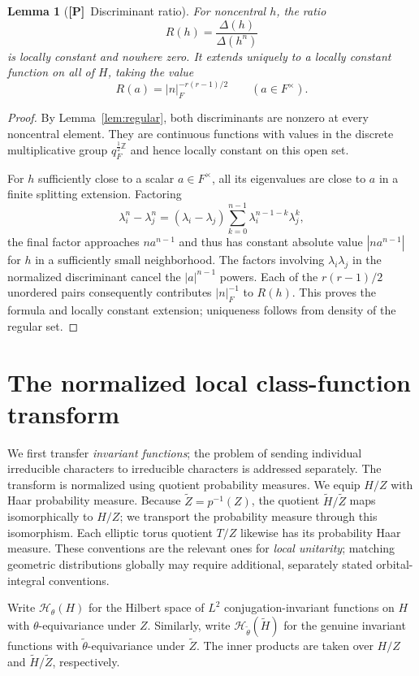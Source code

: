 \documentclass[11pt]{article}
\newcommand{\tH}{\widetilde H}
\newcommand{\tZ}{\widetilde Z}
\newcommand{\Ptag}{\textnormal{\textbf{[P]}}}
\theoremstyle{plain}
\newtheorem{lemma}[theorem]{Lemma}
\theoremstyle{definition}
\begin{document}
\begin{lemma}[\Ptag\ Discriminant ratio]\label{lem:ratio}
For noncentral $h$, the ratio
\[
R(h)=\frac{\Delta(h)}{\Delta(h^n)}
\]
is locally constant and nowhere zero. It extends uniquely to a locally constant function on all of $H$, taking the value
\begin{equation}\label{eq:ratio-at-center}
R(a)=|n|_F^{-r(r-1)/2}\qquad(a\in F^\times).
\end{equation}
\end{lemma}
\begin{proof}
By Lemma~\ref{lem:regular}, both discriminants are nonzero at every noncentral element. They are continuous functions with values in the discrete multiplicative group $q_F^{\frac12\mathbb Z}$ and hence locally constant on this open set.

For $h$ sufficiently close to a scalar $a\in F^\times$, all its eigenvalues are close to $a$ in a finite splitting extension. Factoring
\[
\lambda_i^n-\lambda_j^n=(\lambda_i-\lambda_j)
\sum_{k=0}^{n-1}\lambda_i^{n-1-k}\lambda_j^k,
\]
the final factor approaches $na^{n-1}$ and thus has constant absolute value $|na^{n-1}|$ for $h$ in a sufficiently small neighborhood. The factors involving $\lambda_i\lambda_j$ in the normalized discriminant cancel the $|a|^{n-1}$ powers. Each of the $r(r-1)/2$ unordered pairs consequently contributes $|n|_F^{-1}$ to $R(h)$. This proves the formula and locally constant extension; uniqueness follows from density of the regular set.
\end{proof}

\section{The normalized local class-function transform}\label{sec:local}
We first transfer \emph{invariant functions}; the problem of sending
individual irreducible characters to irreducible characters is
addressed separately. The transform is normalized using quotient
probability measures.
We equip $H/Z$ with Haar probability measure. Because $\tZ=p^{-1}(Z)$, the quotient $\tH/\tZ$ maps isomorphically to $H/Z$; we transport the probability measure through this isomorphism. Each elliptic torus quotient $T/Z$ likewise has its probability Haar measure. These conventions are the relevant ones for \emph{local unitarity}; matching geometric distributions globally may require additional, separately stated orbital-integral conventions.

Write $\mathcal H_\theta(H)$ for the Hilbert space of $L^2$ conjugation-invariant functions on $H$ with $\theta$-equivariance under $Z$. Similarly, write $\mathcal H_{\widetilde\theta}(\tH)$ for the genuine invariant functions with $\widetilde\theta$-equivariance under $\tZ$. The inner products are taken over $H/Z$ and $\tH/\tZ$, respectively.
\end{document}
